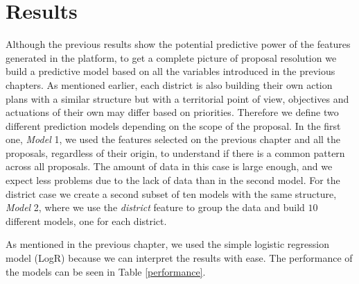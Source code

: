 \chapter{Results}

Although the previous results show the potential predictive power of the features generated in the platform, to get a complete picture of proposal resolution we build a predictive model based on all the variables introduced in the previous chapters. As mentioned earlier, each district is also building their own action plans with a similar structure but with a territorial point of view, objectives and actuations of their own may differ based on priorities. Therefore we define two different prediction models depending on the scope of the proposal. In the first one, \emph{Model} 1, we used the features selected on the previous chapter and all the proposals, regardless of their origin, to understand if there is a common pattern across all proposals. The amount of data in this case is large enough, and we expect less problems due to the lack of data than in the second model. For the district case we create a second subset of ten models with the same structure, \emph{Model} 2, where we use the \emph{district} feature to group the data and build $10$ different models, one for each district.


As mentioned in the previous chapter, we used the simple logistic regression model (LogR) because we can interpret the results with ease. The performance of the models can be seen in Table \ref{performance}.

